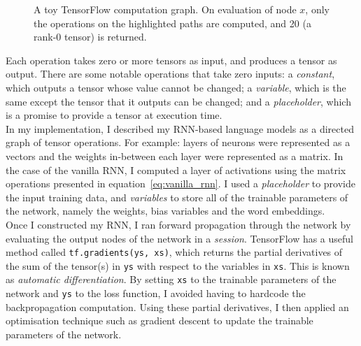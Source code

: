 \documentclass[a4paper, 12pt]{report}
\newcommand{\ttt}[1]{\texttt{#1}}
\newcommand{\tit}[1]{\textit{#1}}
\begin{document}
\begin{figure}[h]
\captionsetup{justification=centering}
\centering
{}
\caption{A toy TensorFlow computation graph. On evaluation of node $x$, only the operations on the highlighted paths are computed, and 20 (a rank-0 tensor) is returned.}
\label{fig:tensorflow}
\end{figure}
Each operation takes zero or more tensors as input, and produces a tensor as output. There are some notable operations that take zero inputs: a \tit{constant}, which outputs a tensor whose value cannot be changed; a \tit{variable}, which is the same except the tensor that it outputs can be changed; and a \tit{placeholder}, which is a promise to provide a tensor at execution time. \\

In my implementation, I described my RNN-based language models as a directed graph of tensor operations. For example: layers of neurons were represented as a vectors and the weights in-between each layer were represented as a matrix. In the case of the vanilla RNN, I computed a layer of activations using the matrix operations presented in equation~\ref{eq:vanilla_rnn}. I used a \tit{placeholder} to provide the input training data, and \tit{variables} to store all of the trainable parameters of the network, namely the weights, bias variables and the word embeddings. \\

Once I constructed my RNN, I ran forward propagation through the network by evaluating the output nodes of the network in a \tit{session}. TensorFlow has a useful method called \ttt{tf.gradients(ys, xs)}, which returns the partial derivatives of the sum of the tensor(s) in \ttt{ys} with respect to the variables in \ttt{xs}. This is known as \tit{automatic differentiation}. By setting \ttt{xs} to the trainable parameters of the network and \ttt{ys} to the loss function, I avoided having to hardcode the backpropagation computation. Using these partial derivatives, I then applied an optimisation technique such as gradient descent to update the trainable parameters of the network. \\
\end{document}

